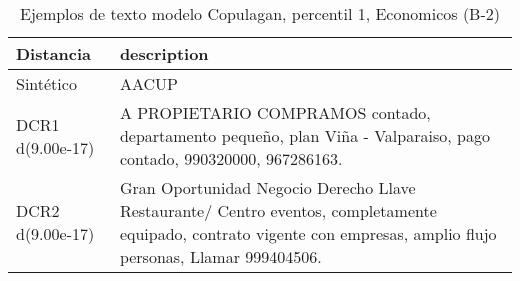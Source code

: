 \begin{table}[H]
\centering
\fontsize{10}{14}\selectfont
\caption{Ejemplos de texto modelo Copulagan, percentil 1, Economicos (B-2)}
\label{table-example-economicos-b-2-copulagan-1p-text}
\begin{tabular}{|l|m{35em}|}
\hline
\rowcolor[gray]{0.8}
Distancia & description \\
\hline Sintético & AACUP \\
\hline DCR1 d(9.00e-17) & A PROPIETARIO COMPRAMOS contado, departamento peque\~no, plan Vi\~na - Valparaiso, pago contado, 990320000, 967286163. \\
\hline DCR2 d(9.00e-17) & Gran Oportunidad Negocio Derecho Llave Restaurante/ Centro eventos, completamente equipado, contrato vigente con empresas, amplio flujo personas, Llamar 999404506. \\
\hline
\end{tabular}
\end{table}
